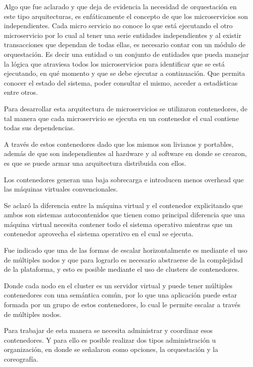 Algo que fue aclarado y que deja de evidencia la necesidad de orquestación en este tipo arquitecturas, es enfáticamente el concepto de que los microservicios son independientes.
Cada micro servicio no conoce lo que está ejecutando el otro microservicio por lo cual al tener una serie entidades independientes y al existir transacciones que dependan de todas ellas, es necesario contar con un módulo de orquestación.
Es decir una entidad o un conjunto de entidades que pueda manejar la lógica que atraviesa todos los microservicios para identificar que se está ejecutando, en qué momento y que se debe ejecutar a continuación.
Que permita conocer el estado del sistema, poder consultar el mismo, acceder a estadísticas entre otros.


Para desarrollar esta arquitectura de microservicios se utilizaron contenedores, de tal manera que cada microservicio se ejecuta en un contenedor el cual contiene todas sus dependencias.

A través de estos contenedores dado que los mismos son livianos y portables, además de que son independientes al hardware y al software en donde se crearon, es que se puede armar una arquitectura distribuida con ellos.

Los contenedores generan una baja sobrecarga e introducen menos overhead que las máquinas virtuales convencionales.


Se aclaró la diferencia entre la máquina virtual y el contenedor explicitando que ambos son sistemas autocontenidos que tienen como principal diferencia que una máquina virtual necesita contener todo el sistema operativo mientras que un contenedor aprovecha el sistema operativo en el cual se ejecuta.


Fue indicado que una de las formas de escalar horizontalmente es mediante el uso de múltiples nodos y que para lograrlo es necesario abstraerse de la complejidad de la plataforma, y esto es posible mediante el uso de clusters de contenedores.


Donde cada nodo en el cluster es un servidor virtual y puede tener múltiples contenedores con una semántica común,
por lo que una aplicación puede estar formada por un grupo de estos contenedores, lo cual le permite escalar a través de múltiples nodos.


Para trabajar de esta manera se necesita administrar y coordinar esos contenedores.
Y para ello es posible realizar dos tipos administración u organización, en donde se señalaron como opciones, la orquestación y la coreografía.

